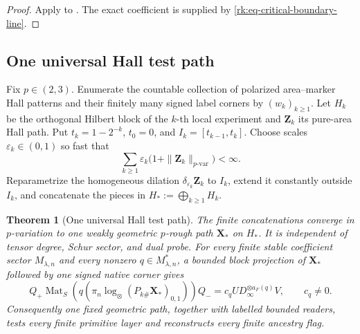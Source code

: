 \documentclass[10pt,reqno]{amsart}
\theoremstyle{plain}
\newtheorem{theorem}{Theorem}[section]
\theoremstyle{definition}
\theoremstyle{remark}
\begin{document}
\begin{proof}
Apply
 to
.  The exact coefficient is supplied by
\eqref{rk:eq-critical-boundary-line}.
\end{proof}

\subsection{One universal Hall test path}
\label{hall:subsec-universal-path}

Fix $p\in(2,3)$.  Enumerate the countable collection of polarized
area--marker Hall patterns and their finitely many signed label corners by
$(w_k)_{k\ge1}$.  Let $H_k$ be the orthogonal Hilbert block of the $k$-th
local experiment and $\mathbf Z_k$ its pure-area Hall path.  Put
$t_k=1-2^{-k}$, $t_0=0$, and $I_k=[t_{k-1},t_k]$.  Choose scales
$\varepsilon_k\in(0,1)$ so fast that
\begin{equation}
 \sum_{k\ge1}\varepsilon_k
 \bigl(1+\|\mathbf Z_k\|_{p\text{-var}}\bigr)<\infty.
 \label{hall:eq-universal-scales}
\end{equation}
Reparametrize the homogeneous dilation
$\delta_{\varepsilon_k}\mathbf Z_k$ to $I_k$, extend it constantly outside
$I_k$, and concatenate the pieces in
$H_*:=\bigoplus_{k\ge1}H_k$.

\begin{theorem}[One universal Hall test path]
\label{hall:thm-universal-path}
The finite concatenations converge in $p$-variation to one weakly geometric
$p$-rough path $\mathbf X_*$ on $H_*$.  It is independent of tensor degree,
Schur sector, and dual probe.  For every finite stable coefficient sector
$M_{\lambda,n}$ and every nonzero $q\in M_{\lambda,n}^*$, a bounded block
projection of $\mathbf X_*$ followed by one signed native corner gives
\begin{equation}
 Q_+\operatorname{Mat}_S\!\left(
 q(\pi_n\log_\otimes(P_{k\#}\mathbf X_*)_{0,1})\right)Q_-
 =c_qUD_\infty^{\otimes a_F(q)}V,
 \qquad c_q\ne0.
 \label{hall:eq-universal-path-corner}
\end{equation}
Consequently one fixed geometric path, together with labelled bounded
readers, tests every finite primitive layer and reconstructs every finite
ancestry flag.
\end{theorem}
\end{document}

